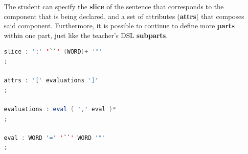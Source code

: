%
%


The student can specify the \textbf{slice} of the sentence that corresponds to the component that is being declared, and a set of attributes (\textbf{attrs}) that composes said component. Furthermore, it is possible to continue to define more \textbf{parts} within one part, just like the teacher's \textsc{DSL} \textbf{subparts}.

\begin{center}
\begin{minipage}{11cm}
\begin{lstlisting}[language=java, basicstyle=\small, label={lst:dsl_slice_prod}, caption=DSL slice/attrs/evaluations/eval productions]
slice : ':' '``' (WORD)+ '"'
;

attrs : '[' evaluations ']'
;

evaluations : eval ( ',' eval )*
;

eval : WORD '=' '``' WORD '"'
;
\end{lstlisting}
\end{minipage}
\end{center}

%
%
%


